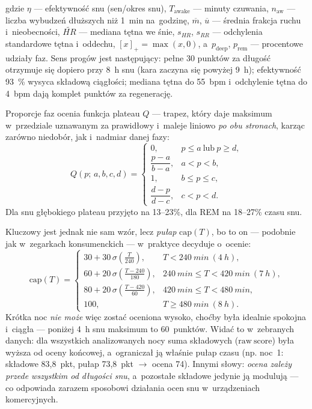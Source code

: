 \documentclass[12pt,a4paper,oneside]{report}
\begin{document}
gdzie $\eta$ --- efektywność snu (sen/okres snu), $T_{\text{awake}}$ --- minuty
czuwania, $n_{\text{aw}}$ --- liczba wybudzeń dłuższych niż \SI{1}{min}
na~godzinę, $\overline{m}$, $\overline{u}$ --- średnia frakcja ruchu
i~nieobecności, $\widetilde{HR}$ --- mediana tętna we śnie, $s_{HR}$, $s_{RR}$
--- odchylenia standardowe tętna i~oddechu, $[x]_+ = \max(x,0)$, a~$p_{\text{deep}}$,
$p_{\text{rem}}$ --- procentowe udziały faz. Sens progów jest następujący:
pełne \num{30} punktów za długość otrzymuje się dopiero przy \SI{8}{h} snu
(kara zaczyna się powyżej \SI{9}{h}); efektywność \SI{93}{\%} wysyca składową
ciągłości; mediana tętna do 55~bpm i~odchylenie tętna do 4~bpm dają komplet
punktów za regenerację.

Proporcje faz ocenia funkcja plateau $Q$ --- trapez, który daje maksimum
w~przedziale uznawanym za prawidłowy i~maleje liniowo \emph{po obu stronach},
karząc zarówno niedobór, jak i~nadmiar danej fazy:
\begin{equation}
  Q(p;\,a,b,c,d) =
  \begin{cases}
    0, & p \leq a \ \text{lub}\ p \geq d,\\[2pt]
    \dfrac{p-a}{b-a}, & a < p < b,\\[4pt]
    1, & b \leq p \leq c,\\[4pt]
    \dfrac{d-p}{d-c}, & c < p < d .
  \end{cases}
  \label{eq:plateau}
\end{equation}
Dla snu głębokiego plateau przyjęto na 13--23\%, dla REM na 18--27\% czasu snu.

Kluczowy jest jednak nie sam wzór, lecz \emph{pułap} $\mathrm{cap}(T)$, bo to on
--- podobnie jak w~zegarkach konsumenckich --- w~praktyce decyduje o~ocenie:
\begin{equation}
  \mathrm{cap}(T) =
  \begin{cases}
    30 + 30\,\sigma\!\left(\frac{T}{240}\right), & T < \SI{240}{min}\ (\SI{4}{h}),\\[4pt]
    60 + 20\,\sigma\!\left(\frac{T-240}{180}\right), & \SI{240}{min} \leq T < \SI{420}{min}\ (\SI{7}{h}),\\[4pt]
    80 + 20\,\sigma\!\left(\frac{T-420}{60}\right), & \SI{420}{min} \leq T < \SI{480}{min},\\[4pt]
    100, & T \geq \SI{480}{min}\ (\SI{8}{h}).
  \end{cases}
  \label{eq:duration-cap}
\end{equation}
Krótka noc \emph{nie może} więc zostać oceniona wysoko, choćby była idealnie
spokojna i~ciągła --- poniżej \SI{4}{h} snu maksimum to 60~punktów. Widać to
w~zebranych danych: dla wszystkich analizowanych nocy suma składowych
($\mathrm{raw\ score}$) była wyższa od oceny końcowej, a~ograniczał ją właśnie
pułap czasu (np. noc~1: składowe 83,8~pkt, pułap 73,8~pkt $\rightarrow$ ocena
74). Innymi słowy: \emph{ocena zależy przede wszystkim od długości snu}, a~pozostałe
składowe jedynie ją modulują --- co odpowiada zarazem sposobowi działania
ocen snu w~urządzeniach komercyjnych.
\end{document}

